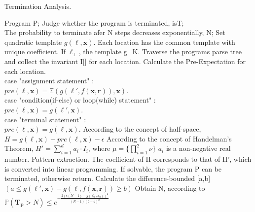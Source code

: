 \begin{algorithm}[htb]  
	\caption{Termination Analysis.}  
	\label{TA}  
	\begin{algorithmic}[1]  
		\REQUIRE 
		Program P; 
		\ENSURE  
		Judge whether the program is terminated, isT;\\
		The probability to terminate afer N steps decreases exponentially, N;
		\STATE Set quadratic template $g(\ell,\boldsymbol{x})$. Each location has the common template with unique coefficient. If $\ell_{\bot}$, the template g=K.
		\STATE Traverse the programs parse tree and collect the invariant I[] for each location.
		\STATE Calculate the Pre-Expectation for each location.\\
		\quad \quad case "assignment statement" :\\
		\quad \quad \quad \quad $pre(\ell,\boldsymbol{x})= \mathbb{E}(g(\ell',f(\boldsymbol{x},\boldsymbol{r})),\boldsymbol{x})$.\\
		\quad \quad case "condition(if-else) or loop(while) statement" :\\
		\quad \quad \quad \quad $pre(\ell,\boldsymbol{x})=g(\ell',\boldsymbol{x})$.\\
		\quad \quad case "terminal statement" :\\
		\quad \quad \quad \quad $pre(\ell,\boldsymbol{x})=g(\ell,\boldsymbol{x}).$
		\STATE According to the concept of half-space, $H=g(\ell,\boldsymbol{x})-pre(\ell,\boldsymbol{x})-\epsilon$
		\STATE According to the concept of Handelman's Theorem, $H'=\sum\limits_{i=1}^{d} a_i\cdot I_i$, where $\mu=\{\prod\limits_{i=1}^{2}\nu\}$ $a_i$ is a non-negative real number.
		\STATE Pattern extraction. The coefficient of H corresponds to that of H', which is converted into linear programming. If solvable, the program P can be terminated, otherwise return.
		\STATE Calculate the difference-bounded [a,b] $(a\leq g(\ell',\boldsymbol{x})-g(\ell,f(\boldsymbol{x},\boldsymbol{r}))\geq b)$
		\STATE Obtain N, according to $\mathbb{P}(\bm{T_p} > N) \leq e^{-\frac{2(\epsilon(N-1)-g(\ell_0,x_0))^2}{(N-1)(b-a)^2}}$
	\end{algorithmic}  
\end{algorithm}  


